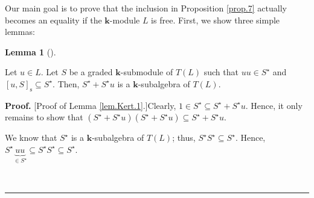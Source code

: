 \documentclass[numbers=enddot,12pt,final,onecolumn,notitlepage]{scrartcl}%
\theoremstyle{definition}
\newtheorem{lem}[theo]{Lemma}
\newenvironment{lemma}[1][]
{\begin{lem}[#1]\begin{leftbar}}
{\end{leftbar}\end{lem}}
\newenvironment{proof}[1][Proof]{\noindent\textbf{#1.} }{\ \rule{0.5em}{0.5em}}
\begin{document}
Our main goal is to prove that the inclusion in Proposition \ref{prop.7}
actually becomes an equality if the $\mathbf{k}$-module $L$ is free. First, we
show three simple lemmas:

\begin{lemma}
\label{lem.Kert.1}Let $u\in L$. Let $S$ be a graded $\mathbf{k}$-submodule of
$T\left(  L\right)  $ such that $uu\in S^{\star}$ and $\left[  u,S\right]
_{\operatorname*{s}}\subseteq S^{\star}$. Then, $S^{\star}+S^{\star}u$ is a
$\mathbf{k}$-subalgebra of $T\left(  L\right)  $.
\end{lemma}

\begin{proof}
[Proof of Lemma \ref{lem.Kert.1}.]Clearly, $1\in S^{\star}\subseteq S^{\star
}+S^{\star}u$. Hence, it only remains to show that $\left(  S^{\star}%
+S^{\star}u\right)  \left(  S^{\star}+S^{\star}u\right)  \subseteq S^{\star
}+S^{\star}u$.

We know that $S^{\star}$ is a $\mathbf{k}$-subalgebra of $T\left(  L\right)
$; thus, $S^{\star}S^{\star}\subseteq S^{\star}$. Hence, $S^{\star
}\underbrace{uu}_{\in S^{\star}}\subseteq S^{\star}S^{\star}\subseteq
S^{\star}$.


\end{proof}
\end{document}
